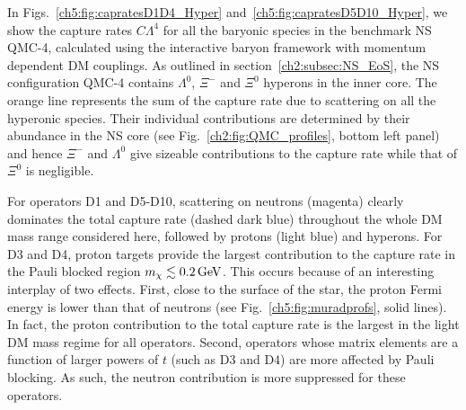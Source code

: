 In Figs.~\ref{ch5:fig:capratesD1D4_Hyper} and~\ref{ch5:fig:capratesD5D10_Hyper}, we show the capture rates $C \Lambda^4$ for all the baryonic species in the benchmark NS QMC-4, calculated using the interactive baryon framework with momentum dependent DM couplings. As outlined in section~\ref{ch2:subsec:NS_EoS}, the NS configuration QMC-4 contains $\Lambda^0$, $\Xi^-$ and $\Xi^0$ hyperons in the inner core.  
The orange line represents the sum of the capture rate due to scattering on all the hyperonic species. Their individual contributions are determined by their abundance in the NS core (see Fig.~\ref{ch2:fig:QMC_profiles}, bottom left panel) and hence $\Xi^-$ and $\Lambda^0$ give sizeable contributions to the capture rate while that of $\Xi^0$ is negligible. 


For operators D1 and D5-D10, scattering on neutrons (magenta) clearly dominates the total capture rate (dashed dark blue) throughout the whole DM mass range considered here, followed by protons (light blue) and hyperons. 
For D3 and D4, proton targets provide the largest contribution to the capture rate in the Pauli blocked region $m_\chi\lesssim0.2{\rm \,GeV}$. This occurs because of an interesting interplay of two effects. First, close to the surface of the star, the proton Fermi energy is lower than that of neutrons (see Fig.~\ref{ch5:fig:muradprofs}, solid lines). In fact, the proton contribution to the total capture rate is the largest in the light DM mass regime for all operators. 
Second, operators whose matrix elements are a function of larger powers of $t$ (such as D3 and D4) are more affected by Pauli blocking. As such, the neutron contribution is more suppressed for these operators. 

